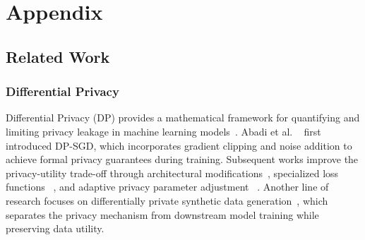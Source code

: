 \documentclass{article}
\begin{document}









\appendix

\section{Appendix}

\subsection{Related Work}\label{app:related_work}

\subsubsection{Differential Privacy}
Differential Privacy (DP) provides a mathematical framework for quantifying and limiting privacy leakage in machine learning models~\cite{abadi2016deep}. Abadi et al. ~\cite{abadi2016deep} first introduced DP-SGD, which incorporates gradient clipping and noise addition to achieve formal privacy guarantees during training. Subsequent works improve the privacy-utility trade-off through architectural modifications~\cite{papernot2021tempered}, specialized loss functions ~\cite{shamsabadi2023losing}, and adaptive privacy parameter adjustment ~\cite{andrew2021differentially,yu2019differentially}. Another line of research focuses on differentially private synthetic data generation~\cite{gong2025dpimagebench}, which separates the privacy mechanism from downstream model training while preserving data utility.
\end{document}
